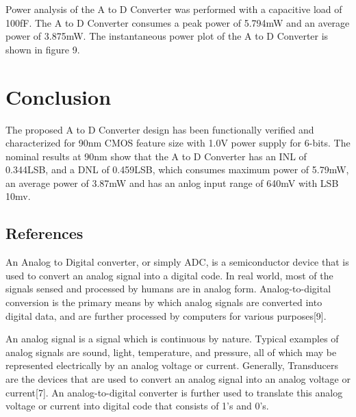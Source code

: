 \par
\hspace{1.2cm}Power analysis of the A to D Converter was performed with a capacitive load of 100fF. The A to D Converter consumes a peak power of 5.794mW and an average power of 3.875mW. The instantaneous power plot of the A to D Converter is shown in figure 9.



\section{Conclusion}

\par
\hspace{1.2cm}The proposed A to D Converter design has been functionally verified and characterized for 90nm CMOS feature size with 1.0V power supply for 6-bits. The nominal results at 90nm show that the A to D Converter has an INL of 0.344LSB, and a DNL of 0.459LSB, which consumes maximum power of 5.79mW, an average power of 3.87mW and has an anlog input range of 640mV with LSB 10mv.


\begin{center}
\section*{References}
\end{center}






\par
\hspace{1.2cm} An Analog to Digital  converter, or simply  ADC, is a semiconductor device that is used to convert an analog signal into a digital code. In real world, most of the signals sensed and processed by humans are in analog form. Analog-to-digital conversion is the primary means by which analog signals are converted into digital data, and are further processed by computers for various purposes[9].\\



\par
\hspace{0.5cm} An analog signal is a signal which is continuous by nature. Typical examples of analog signals are sound, light, temperature, and pressure, all of which may be represented electrically by an analog voltage or current. Generally, Transducers are the devices that are used to convert an analog signal into an analog voltage or current[7].  An analog-to-digital converter is further  used to translate this analog voltage or current into digital code that consists of 1's and 0's.\\

